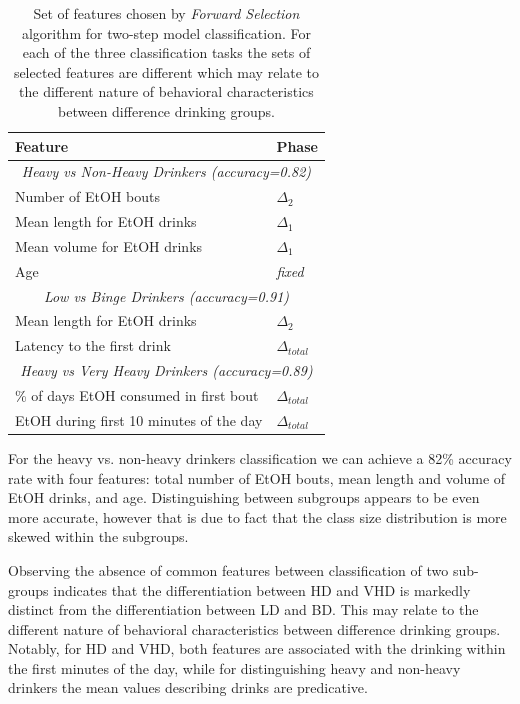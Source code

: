 	\begin{table}[htb]
	\centering
	\caption{Set of features chosen by \textit{Forward Selection} algorithm for two-step model classification. For each of the three classification tasks the sets of selected features are different which may relate to the different nature of behavioral characteristics between difference drinking groups.}
	\label{tab:selected-features}
	\begin{tabular}{ll}
	\hline
	\abovespace\belowspace
	\toprule Feature & Phase  \\ \midrule		
	\multicolumn{2}{c}{\textit{Heavy vs Non-Heavy Drinkers (accuracy=0.82)}} \\
	Number of EtOH bouts & $\Delta_2$ \\
	Mean length for EtOH drinks &  $\Delta_1$\\
	Mean volume for EtOH drinks & $\Delta_1$\\
	Age & \textit{fixed}\\ 
	
	\midrule
	\multicolumn{2}{c}{\textit{Low vs Binge Drinkers (accuracy=0.91)}} \\
	Mean length for EtOH drinks &  $\Delta_2$\\
	Latency to the first drink & $\Delta_{total}$\\
	
	\midrule
	\multicolumn{2}{c}{\textit{Heavy vs Very Heavy Drinkers (accuracy=0.89)}} \\
	\% of days EtOH consumed in first bout &  $\Delta_{total}$\\
	EtOH during first 10 minutes of the day & $\Delta_{total}$ \\ 	
	\bottomrule
	\end{tabular}
	\end{table}
	
	For the heavy vs. non-heavy drinkers classification we can achieve a 82\% accuracy rate with four features: total number of EtOH bouts, mean length and volume of EtOH drinks, and age. Distinguishing between subgroups appears to be even more accurate, however that is due to  fact that the class size distribution is more skewed within the subgroups. 
	
	Observing the absence of common features between classification of two sub-groups indicates that the differentiation between HD and VHD is markedly distinct from the differentiation between LD and BD. This may relate to the different nature of behavioral characteristics between difference drinking groups. Notably, for HD and VHD, both features are associated with the drinking within the first minutes of the day, while for distinguishing heavy and non-heavy drinkers the mean values describing drinks are predicative.



